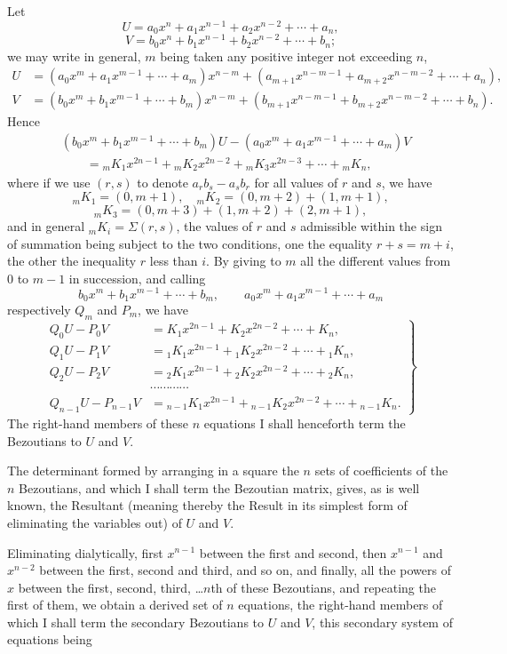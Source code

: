 \documentclass[11pt]{article}
\newcommand{\sourcepage}[1]{\marginpar{\scriptsize p.~#1}}
\begin{document}
\sourcepage{444}
Let
\[
U=a_0x^n+a_1x^{n-1}+a_2x^{n-2}+\cdots+a_n,
\]
\[
V=b_0x^n+b_1x^{n-1}+b_2x^{n-2}+\cdots+b_n;
\]
we may write in general, $m$ being taken any positive integer not exceeding $n$,
\[
\begin{aligned}
U&=(a_0x^m+a_1x^{m-1}+\cdots+a_m)x^{n-m}
 +(a_{m+1}x^{n-m-1}+a_{m+2}x^{n-m-2}+\cdots+a_n),\\
V&=(b_0x^m+b_1x^{m-1}+\cdots+b_m)x^{n-m}
 +(b_{m+1}x^{n-m-1}+b_{m+2}x^{n-m-2}+\cdots+b_n).
\end{aligned}
\]
Hence
\[
\begin{aligned}
&(b_0x^m+b_1x^{m-1}+\cdots+b_m)U
 -(a_0x^m+a_1x^{m-1}+\cdots+a_m)V\\
&\qquad = {}_mK_1x^{2n-1}+{}_mK_2x^{2n-2}+{}_mK_3x^{2n-3}+\cdots+{}_mK_n,
\end{aligned}
\tag{9}
\]
where if we use $(r,s)$ to denote $a_rb_s-a_sb_r$ for all values of $r$ and $s$, we have
\[
{}_mK_1=(0,m+1),\quad
{}_mK_2=(0,m+2)+(1,m+1),
\]
\[
{}_mK_3=(0,m+3)+(1,m+2)+(2,m+1),
\]
and in general ${}_mK_i=\Sigma(r,s)$, the values of $r$ and $s$ admissible within the sign of summation being subject to the two conditions, one the equality $r+s=m+i$, the other the inequality $r$ less than $i$. By giving to $m$ all the different values from 0 to $m-1$ in succession, and calling
\[
b_0x^m+b_1x^{m-1}+\cdots+b_m,\qquad
a_0x^m+a_1x^{m-1}+\cdots+a_m
\]
respectively $Q_m$ and $P_m$, we have
\[
\left.
\begin{aligned}
Q_0U-P_0V&=K_1x^{2n-1}+K_2x^{2n-2}+\cdots+K_n,\\
Q_1U-P_1V&={}_1K_1x^{2n-1}+{}_1K_2x^{2n-2}+\cdots+{}_1K_n,\\
Q_2U-P_2V&={}_2K_1x^{2n-1}+{}_2K_2x^{2n-2}+\cdots+{}_2K_n,\\
&\cdots\cdots\cdots\cdots\\
Q_{n-1}U-P_{n-1}V&={}_{n-1}K_1x^{2n-1}+{}_{n-1}K_2x^{2n-2}+\cdots+{}_{n-1}K_n.
\end{aligned}
\right\}
\tag{10}
\]
The right-hand members of these $n$ equations I shall henceforth term the Bezoutians to $U$ and $V$.

The determinant formed by arranging in a square the $n$ sets of coefficients of the $n$ Bezoutians, and which I shall term the Bezoutian matrix, gives, as is well known, the Resultant (meaning thereby the Result in its simplest form of eliminating the variables out) of $U$ and $V$.

Eliminating dialytically, first $x^{n-1}$ between the first and second, then $x^{n-1}$ and $x^{n-2}$ between the first, second and third, and so on, and finally, all the powers of $x$ between the first, second, third, \ldots $n$th of these Bezoutians, and repeating the first of them, we obtain a derived set of $n$ equations, the right-hand members of which I shall term the secondary Bezoutians to $U$ and $V$, this secondary system of equations being
\end{document}
